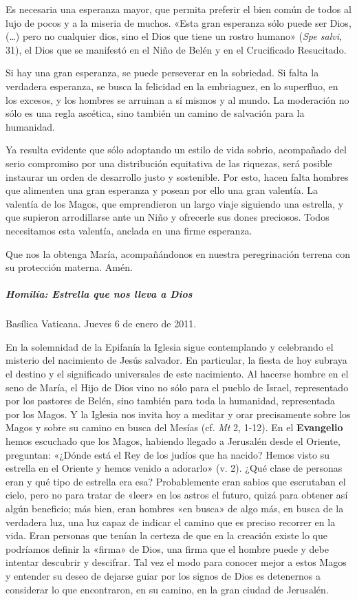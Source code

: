 \documentclass[]{article}
\let\oldsubparagraph\subparagraph
\renewcommand{\subparagraph}[1]{\oldsubparagraph{#1}\mbox{}}
\begin{document}
Es necesaria una esperanza mayor, que permita preferir el bien común de
todos al lujo de pocos y a la miseria de muchos. «Esta gran esperanza
sólo puede ser Dios, (\ldots{}) pero no cualquier dios, sino el Dios que
tiene un rostro humano» (\emph{Spe salvi}, 31), el Dios que se manifestó
en el Niño de Belén y en el Crucificado Resucitado.

Si hay una gran esperanza, se puede perseverar en la sobriedad. Si falta
la verdadera esperanza, se busca la felicidad en la embriaguez, en lo
superfluo, en los excesos, y los hombres se arruinan a sí mismos y al
mundo. La moderación no sólo es una regla ascética, sino también un
camino de salvación para la humanidad.

Ya resulta evidente que sólo adoptando un estilo de vida sobrio,
acompañado del serio compromiso por una distribución equitativa de las
riquezas, será posible instaurar un orden de desarrollo justo y
sostenible. Por esto, hacen falta hombres que alimenten una gran
esperanza y posean por ello una gran valentía. La valentía de los Magos,
que emprendieron un largo viaje siguiendo una estrella, y que supieron
arrodillarse ante un Niño y ofrecerle sus dones preciosos. Todos
necesitamos esta valentía, anclada en una firme esperanza.

Que nos la obtenga María, acompañándonos en nuestra peregrinación
terrena con su protección materna. Amén.

\subparagraph{Homilía: Estrella que nos lleva a
Dios}\label{homiluxeda-estrella-que-nos-lleva-a-dios}

Basílica Vaticana. Jueves 6 de enero de 2011.

En la solemnidad de la Epifanía la Iglesia sigue contemplando y
celebrando el misterio del nacimiento de Jesús salvador. En particular,
la fiesta de hoy subraya el destino y el significado universales de este
nacimiento. Al hacerse hombre en el seno de María, el Hijo de Dios vino
no sólo para el pueblo de Israel, representado por los pastores de
Belén, sino también para toda la humanidad, representada por los Magos.
Y la Iglesia nos invita hoy a meditar y orar precisamente sobre los
Magos y sobre su camino en busca del Mesías (cf. \emph{Mt} 2, 1-12). En
el \textbf{Evangelio} hemos escuchado que los Magos, habiendo llegado a
Jerusalén desde el Oriente, preguntan: «¿Dónde está el Rey de los judíos
que ha nacido? Hemos visto su estrella en el Oriente y hemos venido a
adorarlo» (v. 2). ¿Qué clase de personas eran y qué tipo de estrella era
esa? Probablemente eran sabios que escrutaban el cielo, pero no para
tratar de «leer» en los astros el futuro, quizá para obtener así algún
beneficio; más bien, eran hombres «en busca» de algo más, en busca de la
verdadera luz, una luz capaz de indicar el camino que es preciso
recorrer en la vida. Eran personas que tenían la certeza de que en la
creación existe lo que podríamos definir la «firma» de Dios, una firma
que el hombre puede y debe intentar descubrir y descifrar. Tal vez el
modo para conocer mejor a estos Magos y entender su deseo de dejarse
guiar por los signos de Dios es detenernos a considerar lo que
encontraron, en su camino, en la gran ciudad de Jerusalén.
\end{document}
